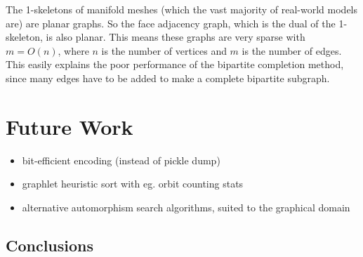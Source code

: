 \documentclass{egpubl}
\begin{document}
The 1-skeletons of manifold meshes (which the vast majority of real-world models are) are planar graphs. So the face adjacency graph, which is the dual of the 1-skeleton, is also planar. This means these graphs are very sparse with $m = O(n)$, where $n$ is the number of vertices and $m$ is the number of edges. This easily explains the poor performance of the bipartite completion method, since many edges have to be added to make a complete bipartite subgraph.  


\section{Future Work}
\begin{itemize}
        \item bit-efficient encoding (instead of pickle dump)
        \item graphlet heuristic sort with eg. orbit counting stats
        \item alternative automorphism search algorithms, suited to the graphical domain
\end{itemize}

\subsection{Conclusions}



%



\end{document}
